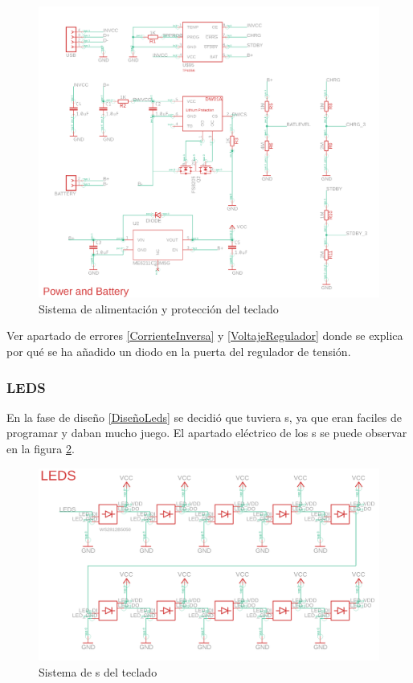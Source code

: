 \begin{figure}[H]
    \centering
    \includegraphics[width=1.0\textwidth]{imagenes/Capitulos/Cap04/Battery.png}
    \caption{Sistema de alimentación y protección del teclado}
    \label{fig:CircuitoBateriaAlimentacion}
\end{figure}

\begin{tcolorbox}[colback=red!11!white, colframe=red!50!white, title=Errores]
    Ver apartado de errores \ref{CorrienteInversa} y \ref{VoltajeRegulador} donde se explica por qué se ha añadido un diodo en la puerta del regulador de tensión.
\end{tcolorbox}

\newpage
\subsubsection{\gls{LED}S}
En la fase de diseño \ref{DiseñoLeds} se decidió que tuviera s, ya que eran faciles de programar y daban mucho juego. El apartado eléctrico de los s se puede observar en la figura \ref{fig:CircuitoLeds}.

\begin{figure}[H]
    \centering
    \includegraphics[width=1.0\textwidth]{imagenes/Capitulos/Cap04/LEDs.png}
    \caption{Sistema de s del teclado}
    \label{fig:CircuitoLeds}
\end{figure}

